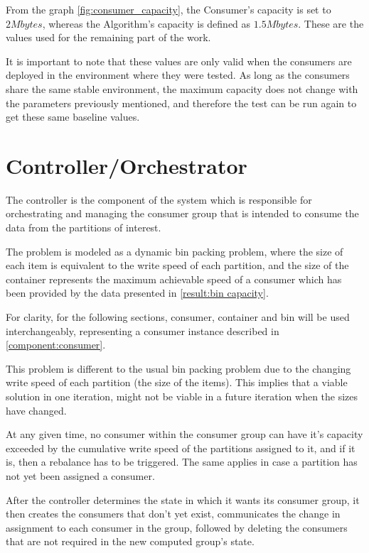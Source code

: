 From the graph \ref{fig:consumer_capacity}, the Consumer's capacity is set to $2
        Mbytes$, whereas the Algorithm's capacity is defined as $1.5 Mbytes$.
        These are the values used for the remaining part of the work.

It is important to note that these values are only valid when the consumers are
        deployed in the environment where they were tested. As long as the
        consumers share the same stable environment, the maximum capacity does
        not change with the parameters previously mentioned, and therefore the
        test can be run again to get these same baseline values. 

\section{Controller/Orchestrator} \label{component:controller}

The controller is the component of the system which is responsible for
orchestrating and managing the consumer group that is intended to consume the
data from the partitions of interest. 

The problem is modeled as a dynamic bin packing problem, where the size of each
item is equivalent to the write speed of each partition, and the size of the
container represents the maximum achievable speed of a consumer which has been
provided by the data presented in \ref{result:bin capacity}.

For clarity, for the following sections, consumer, container and bin will be
used interchangeably, representing a consumer instance described in
\ref{component:consumer}.

This problem is different to the usual bin packing problem due to the changing
write speed of each partition (the size of the items). This implies that a
viable solution in one iteration, might not be viable in a future iteration when
the sizes have changed.

At any given time, no consumer within the consumer group can have it's capacity
exceeded by the cumulative write speed of the partitions assigned to it, and if
it is, then a rebalance has to be triggered. The same applies in case a
partition has not yet been assigned a consumer.

After the controller determines the state in which it wants its consumer group,
it then creates the consumers that don't yet exist, communicates the change in
assignment to each consumer in the group, followed by deleting the consumers
that are not required in the new computed group's state.

